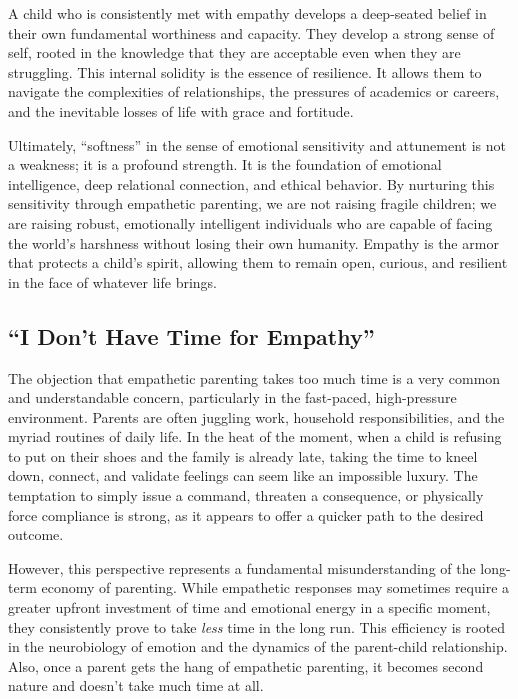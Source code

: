 A child who is consistently met with empathy develops a deep-seated belief in their own fundamental worthiness and capacity.
They develop a strong sense of self, rooted in the knowledge that they are acceptable even when they are struggling.
This internal solidity is the essence of resilience.
It allows them to navigate the complexities of relationships, the pressures of academics or careers, and the inevitable losses of life with grace and fortitude.

Ultimately, ``softness'' in the sense of emotional sensitivity and attunement is not a weakness; it is a profound strength.
It is the foundation of emotional intelligence, deep relational connection, and ethical behavior.
By nurturing this sensitivity through empathetic parenting, we are not raising fragile children; we are raising robust, emotionally intelligent individuals who are capable of facing the world's harshness without losing their own humanity.
Empathy is the armor that protects a child's spirit, allowing them to remain open, curious, and resilient in the face of whatever life brings.

\subsection{``I Don't Have Time for Empathy''}

The objection that empathetic parenting takes too much time is a very common and understandable concern, particularly in the fast-paced, high-pressure environment.
Parents are often juggling work, household responsibilities, and the myriad routines of daily life.
In the heat of the moment, when a child is refusing to put on their shoes and the family is already late, taking the time to kneel down, connect, and validate feelings can seem like an impossible luxury.
The temptation to simply issue a command, threaten a consequence, or physically force compliance is strong, as it appears to offer a quicker path to the desired outcome.

However, this perspective represents a fundamental misunderstanding of the long-term economy of parenting.
While empathetic responses may sometimes require a greater upfront investment of time and emotional energy in a specific moment, they consistently prove to take \textit{less} time in the long run.
This efficiency is rooted in the neurobiology of emotion and the dynamics of the parent-child relationship.
Also, once a parent gets the hang of empathetic parenting, it becomes second nature and doesn't take much time at all.

